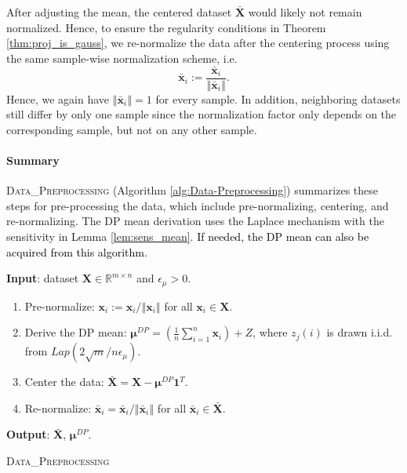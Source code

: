\documentclass[USenglish,oneside,twocolumn]{article}
\newcommand{\noun}[1]{\textsc{#1}}
\theoremstyle{definition}
\theoremstyle{remark}
\theoremstyle{plain}
\theoremstyle{plain}
\newcommand{\chang}{\textcolor{black}}
\begin{document}
After adjusting the mean, the centered dataset $\bar{\mathbf{X}}$
would likely not remain normalized. Hence, to ensure the regularity
conditions in Theorem \ref{thm:proj_is_gauss}, we re-normalize the
data after the centering process using the same sample-wise normalization
scheme, i.e.
\[
\bar{\mathbf{x}}_{i}:=\frac{\bar{\mathbf{x}}_{i}}{\left\Vert \bar{\mathbf{x}}_{i}\right\Vert }.
\]
Hence, we again have $\left\Vert \bar{\mathbf{x}}_{i}\right\Vert =1$
for every sample. In addition, neighboring datasets still differ by
only one sample since the normalization factor only depends on the
corresponding sample, but not on any other sample.

\vspace{-1em}
\paragraph{Summary}
\noun{Data\_Preprocessing} (Algorithm \ref{alg:Data-Preprocessing})
summarizes these steps for pre-processing the data, which include pre-normalizing,
centering, and re-normalizing. The DP mean derivation uses the Laplace
mechanism with the sensitivity in Lemma \ref{lem:sens_mean}. \chang{If needed, the DP mean can also be acquired from this algorithm.}

\begin{algorithm}
{\small \par
\textbf{Input}{: dataset $\mathbf{X}\in\mathbb{R}^{m\times n}$
and $\epsilon_{\mu}>0$.}{\par}
\vspace{0.5em}
\begin{enumerate}
\item {Pre-normalize: $\mathbf{x}_{i}:=\mathbf{x}_{i}/\left\Vert \mathbf{x}_{i}\right\Vert $
for all $\mathbf{x}_{i}\in\mathbf{X}$.}{\par}
\item {Derive the DP mean: $\boldsymbol{\mu}^{DP}=(\frac{1}{n}\sum_{i=1}^{n}\mathbf{x}_{i})+Z$,
where $z_{j}(i)$ is drawn i.i.d. from $Lap(2\sqrt{m}/n\epsilon_{\mu})$.}{\par}
\item {Center the data: $\bar{\mathbf{X}}=\mathbf{X}-\boldsymbol{\mu}^{DP}\mathbf{1}^{T}$.}{\par}
\item {Re-normalize: $\bar{\mathbf{x}}_{i}=\bar{\mathbf{x}}_{i}/\left\Vert \bar{\mathbf{x}}_{i}\right\Vert $
for all $\bar{\mathbf{x}}_{i}\in\bar{\mathbf{X}}$.
}{\par}
\end{enumerate}
\vspace{-0.5em}
\textbf{Output}{: $\bar{\mathbf{X}}$, $\boldsymbol{\mu}^{DP}$. }{\par}
}
\caption{\noun{Data\_Preprocessing} \label{alg:Data-Preprocessing}}

\end{algorithm}
\end{document}
